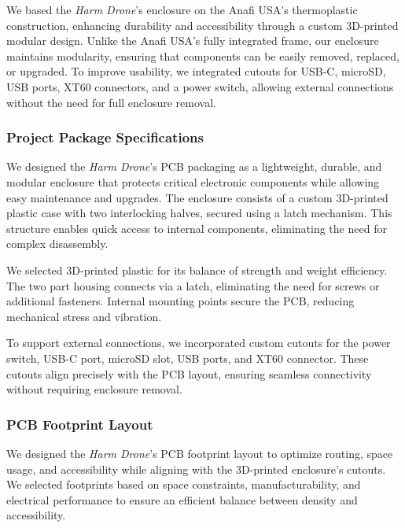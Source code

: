 \documentclass[12pt]{article}
\begin{document}
\par We based the \textit{Harm Drone}’s enclosure on the Anafi USA’s thermoplastic construction, enhancing durability and accessibility through a custom 3D-printed modular design. Unlike the Anafi USA’s fully integrated frame, our enclosure maintains modularity, ensuring that components can be easily removed, replaced, or upgraded. To improve usability, we integrated cutouts for USB-C, microSD, USB ports, XT60 connectors, and a power switch, allowing external connections without the need for full enclosure removal.

\subsubsection{Project Package Specifications}

\par We designed the \textit{Harm Drone}’s PCB packaging as a lightweight, durable, and modular enclosure that protects critical electronic components while allowing easy maintenance and upgrades. The enclosure consists of a custom 3D-printed plastic case with two interlocking halves, secured using a latch mechanism. This structure enables quick access to internal components, eliminating the need for complex disassembly.

\par We selected 3D-printed plastic for its balance of strength and weight efficiency. The two part housing connects via a latch, eliminating the need for screws or additional fasteners. Internal mounting points secure the PCB, reducing mechanical stress and vibration.

\par To support external connections, we incorporated custom cutouts for the power switch, USB-C port, microSD slot, USB ports, and XT60 connector. These cutouts align precisely with the PCB layout, ensuring seamless connectivity without requiring enclosure removal.

\subsubsection{PCB Footprint Layout}

\par We designed the \textit{Harm Drone}’s PCB footprint layout to optimize routing, space usage, and accessibility while aligning with the 3D-printed enclosure’s cutouts. We selected footprints based on space constraints, manufacturability, and electrical performance to ensure an efficient balance between density and accessibility.
\end{document}
